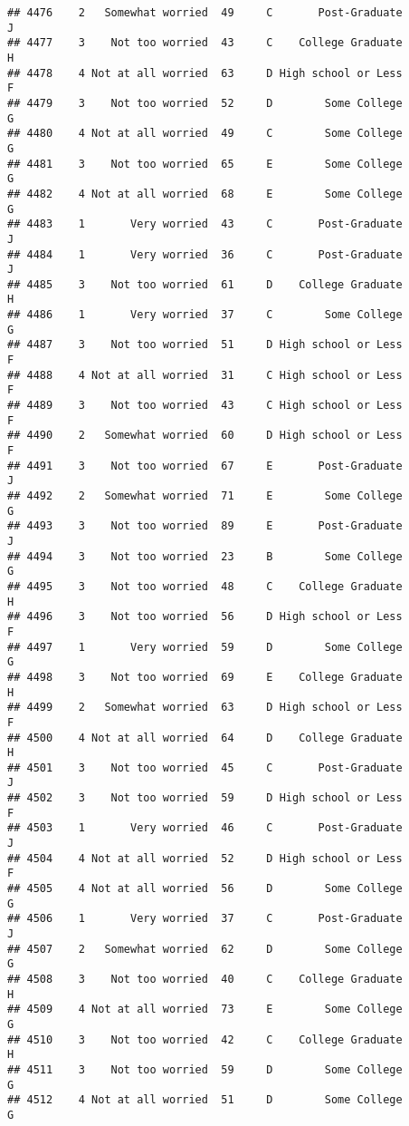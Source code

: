 \documentclass[
]{article}
\begin{document}
\begin{verbatim}
## 4476    2   Somewhat worried  49     C       Post-Graduate         J
## 4477    3    Not too worried  43     C    College Graduate         H
## 4478    4 Not at all worried  63     D High school or Less         F
## 4479    3    Not too worried  52     D        Some College         G
## 4480    4 Not at all worried  49     C        Some College         G
## 4481    3    Not too worried  65     E        Some College         G
## 4482    4 Not at all worried  68     E        Some College         G
## 4483    1       Very worried  43     C       Post-Graduate         J
## 4484    1       Very worried  36     C       Post-Graduate         J
## 4485    3    Not too worried  61     D    College Graduate         H
## 4486    1       Very worried  37     C        Some College         G
## 4487    3    Not too worried  51     D High school or Less         F
## 4488    4 Not at all worried  31     C High school or Less         F
## 4489    3    Not too worried  43     C High school or Less         F
## 4490    2   Somewhat worried  60     D High school or Less         F
## 4491    3    Not too worried  67     E       Post-Graduate         J
## 4492    2   Somewhat worried  71     E        Some College         G
## 4493    3    Not too worried  89     E       Post-Graduate         J
## 4494    3    Not too worried  23     B        Some College         G
## 4495    3    Not too worried  48     C    College Graduate         H
## 4496    3    Not too worried  56     D High school or Less         F
## 4497    1       Very worried  59     D        Some College         G
## 4498    3    Not too worried  69     E    College Graduate         H
## 4499    2   Somewhat worried  63     D High school or Less         F
## 4500    4 Not at all worried  64     D    College Graduate         H
## 4501    3    Not too worried  45     C       Post-Graduate         J
## 4502    3    Not too worried  59     D High school or Less         F
## 4503    1       Very worried  46     C       Post-Graduate         J
## 4504    4 Not at all worried  52     D High school or Less         F
## 4505    4 Not at all worried  56     D        Some College         G
## 4506    1       Very worried  37     C       Post-Graduate         J
## 4507    2   Somewhat worried  62     D        Some College         G
## 4508    3    Not too worried  40     C    College Graduate         H
## 4509    4 Not at all worried  73     E        Some College         G
## 4510    3    Not too worried  42     C    College Graduate         H
## 4511    3    Not too worried  59     D        Some College         G
## 4512    4 Not at all worried  51     D        Some College         G

\end{verbatim}
\end{document}
